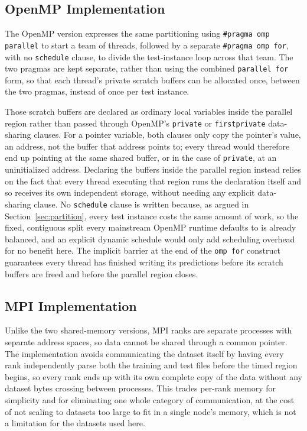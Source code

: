 \documentclass[conference]{IEEEtran}
\begin{document}
\subsection{OpenMP Implementation}

The OpenMP version expresses the same partitioning using
\texttt{\#pragma omp parallel} to start a team of threads, followed by a
separate \texttt{\#pragma omp for}, with no \texttt{schedule} clause, to
divide the test-instance loop across that team. The two pragmas are kept separate,
rather than using the combined \texttt{parallel for} form, so that each
thread's private scratch buffers can be allocated once, between the two
pragmas, instead of once per test instance.

Those scratch buffers are declared as ordinary local variables inside the
parallel region rather than passed through OpenMP's \texttt{private} or
\texttt{firstprivate} data-sharing clauses. For a pointer variable, both
clauses only copy the pointer's value, an address, not the buffer that
address points to; every thread would therefore end up pointing at the
same shared buffer, or in the case of \texttt{private}, at an
uninitialized address. Declaring the buffers inside the parallel region
instead relies on the fact that every thread executing that region runs
the declaration itself and so receives its own independent storage,
without needing any explicit data-sharing clause. No \texttt{schedule}
clause is written because, as argued in Section~\ref{sec:partition}, every
test instance costs the same amount of work, so the fixed, contiguous
split every mainstream OpenMP runtime defaults to is already balanced, and
an explicit dynamic schedule would only add scheduling overhead for no
benefit here. The implicit barrier at the end of the \texttt{omp for} construct guarantees
every thread has finished writing its predictions before its scratch
buffers are freed and before the parallel region closes.

\subsection{MPI Implementation}

Unlike the two shared-memory versions, MPI ranks are separate processes
with separate address spaces, so data cannot be shared through a common
pointer. The implementation avoids communicating the dataset itself by
having every rank independently parse both the training and test files
before the timed region begins, so every rank ends up with its own
complete copy of the data without any dataset bytes crossing between
processes. This trades per-rank memory for simplicity and for eliminating
one whole category of communication, at the cost of not scaling to
datasets too large to fit in a single node's memory, which is not a
limitation for the datasets used here.
\end{document}
